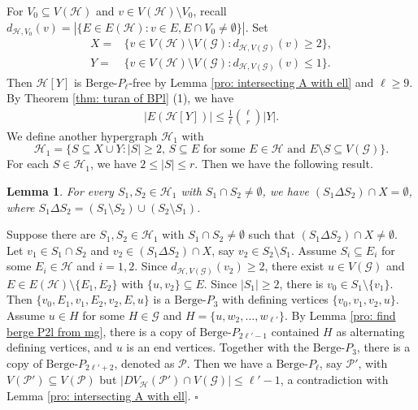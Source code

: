 \documentclass[12pt]{article}%
\newtheorem{lemma}[theorem]{Lemma}
\newenvironment{proof}{{\noindent\it Proof.}}{\hfill $\square$\par}
\newcommand{\ber}{\text{Berge-}}
\newcommand{\mh}{\mathcal{H}}
\newcommand{\mg}{\mathcal{G}}
\begin{document}




For  $V_0\subseteq V(\mh)$ and  $v\in V(\mh)\setminus V_0$, recall $d_{\mh,V_0}(v)=|\{E\in E(\mh):v\in E,E\cap V_0\not=\emptyset\}|$. Set
\begin{equation*}
    \begin{aligned}
        X=&\{v\in V(\mh)\setminus V(\mg):d_{\mh,V(\mg)}(v)\geq 2\},\\
        Y=&\{v\in V(\mh)\setminus V(\mg):d_{\mh,V(\mg)}(v)\leq 1\}.
    \end{aligned}
\end{equation*}
Then $\mh[Y]$ is $\ber P_{\ell}$-free by Lemma \ref{pro: intersecting A with ell} and $\ell\ge 9$. By Theorem \ref{thm: turan of BPl} (1), we have
\begin{align}\label{eq4-1}|E(\mh[Y])|\leq \frac{1}{\ell}\binom{\ell}{r}|Y|.\end{align}
We define another hypergraph $\mh_1$ with %
$$\mh_1=\{S\subseteq X\cup Y: \text{$|S|\geq 2$, $S\subseteq E$ for some $E\in \mh$ and $E\setminus S\subseteq V(\mg)$}\}.$$
For each $S\in \mh_1$, we have $2\le |S|\le r$.
Then we have the following result.
\begin{lemma}\label{lem: no Berge P3}
    For every $S_1,S_2\in \mh_1$ with $S_1\cap S_2\neq \emptyset$, we have $(S_1\Delta S_2)\cap X=\emptyset$, where $S_1\Delta S_2=(S_1\setminus S_2)\cup (S_2\setminus S_1)$.
\end{lemma}
\begin{proof} Suppose there are $S_1,S_2\in \mh_1$ with $S_1\cap S_2\neq \emptyset$ such that $(S_1\Delta S_2)\cap X\not=\emptyset$.
    Let $v_1\in S_1\cap S_2$ and $v_2\in (S_1\Delta S_2)\cap X$, say $v_2\in S_2\setminus S_1$. Assume $S_i\subseteq E_i$ for some $E_i\in \mh$ and $i=1,2$. Since  $d_{\mh,V(\mg)}(v_2)\geq 2$, there exist $u\in V(\mg)$ and  $E\in E(\mh)\setminus\{E_1,E_2\}$ with $\{u,v_2\}\subseteq E$. Since $|S_1|\ge 2$, there is $v_0\in S_1\setminus\{v_1\}$. Then $\{v_0,E_1,v_1,E_2,v_2,E,u\}$ is a $\ber P_{3}$ with defining vertices $\{v_0,v_1,v_2,u\}$.
    Assume $u\in H$ for some $H\in \mg$ and $H=\{u,w_2,\dots,w_{\ell'}\}$. By Lemma \ref{pro: find berge P2l from mg}, there is a copy of $\ber P_{2\ell'-1}$ contained $H$ as alternating defining vertices, and $u$ is an end vertices. Together with the $\ber P_{3}$, there is a copy of $\ber P_{2\ell'+2}$, denoted as $\mathcal{P}$. Then we have a $\ber P_{\ell}$, say $\mathcal{P}'$, with $V(\mathcal{P}')\subseteq V(\mathcal{P})$ but $|DV_\mh(\mathcal{P}')\cap V(\mg)|\le \ell'-1$,
     a contradiction with Lemma \ref{pro: intersecting A with ell}.
\end{proof}
\end{document}
